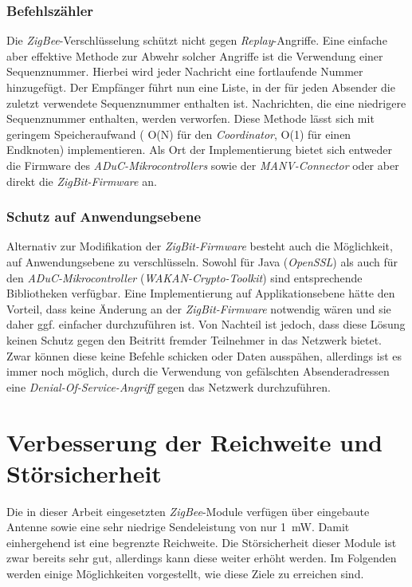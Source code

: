 \subsubsection{Befehlszähler}
Die \emph{ZigBee}-Verschlüsselung schützt nicht gegen \emph{Replay}-Angriffe. Eine einfache aber effektive Methode 
zur Abwehr solcher
Angriffe ist die Verwendung einer Sequenznummer. Hierbei wird jeder Nachricht eine fortlaufende Nummer hinzugefügt. 
Der Empfänger führt nun eine Liste, in der für jeden Absender die zuletzt verwendete Sequenznummer enthalten ist.
Nachrichten, die eine niedrigere Sequenznummer enthalten, werden verworfen. Diese Methode lässt sich mit geringem
Speicheraufwand ( O(N) für den \emph{Coordinator}, O(1) für einen Endknoten) implementieren. Als Ort der Implementierung
bietet sich entweder die Firmware des \emph{ADuC-Mikrocontrollers} sowie der \emph{MANV-Connector} oder aber direkt 
die \emph{ZigBit-Firmware} an.

\subsubsection{Schutz auf Anwendungsebene}
Alternativ zur Modifikation der \emph{ZigBit-Firmware} besteht auch die Möglichkeit, auf Anwendungsebene zu verschlüsseln.
Sowohl für Java (\emph{OpenSSL}) als auch für den \emph{ADuC-Mikrocontroller} (\emph{WAKAN-Crypto-Toolkit}) sind 
entsprechende Bibliotheken
verfügbar. Eine Implementierung auf Applikationsebene hätte den Vorteil, dass keine Änderung an der \emph{ZigBit-Firmware}
notwendig wären und sie daher ggf. einfacher durchzuführen ist. Von Nachteil ist jedoch, dass diese Lösung keinen Schutz
gegen den Beitritt fremder Teilnehmer in das Netzwerk bietet. Zwar können diese keine Befehle schicken oder Daten ausspähen,
allerdings ist es immer noch möglich, durch die Verwendung von gefälschten Absenderadressen eine 
\emph{Denial-Of-Service-Angriff} gegen das Netzwerk durchzuführen. 

\section{Verbesserung der Reichweite und Störsicherheit}
Die in dieser Arbeit eingesetzten \emph{ZigBee}-Module verfügen über eingebaute Antenne sowie eine sehr 
niedrige Sendeleistung von nur 1~mW. Damit einhergehend ist eine begrenzte Reichweite. Die Störsicherheit dieser Module
ist zwar bereits sehr gut, allerdings kann diese weiter erhöht werden. Im Folgenden werden einige Möglichkeiten
vorgestellt, wie diese Ziele zu erreichen sind.

